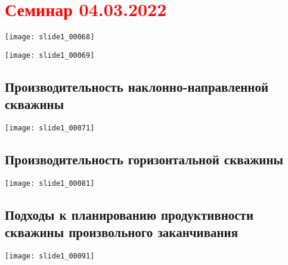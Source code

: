 \documentclass[main.tex]{subfiles}
\begin{document}
\section{\textcolor{red}{Семинар 04.03.2022}}

\texttt{[image: slide1\_00068]}

\texttt{[image: slide1\_00069]}

\subsection{Производительность наклонно-направленной скважины}

\texttt{[image: slide1\_00071]}








\subsection{Производительность горизонтальной скважины}

\texttt{[image: slide1\_00081]}









\subsection{Подходы к планированию продуктивности скважины произвольного заканчивания}

\texttt{[image: slide1\_00091]}


\end{document}
